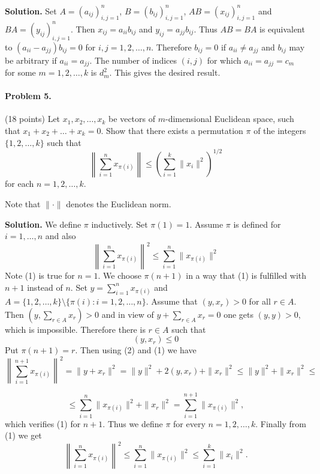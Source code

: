 \documentclass{article}
\begin{document}
\textbf{Solution.}
Set $A = (a_{ij})_{i,j=1}^n$, $B = (b_{ij})_{i,j=1}^n$, $AB = (x_{ij})_{i,j=1}^n$
and $BA = (y_{ij})_{i,j=1}^n$.
Then $x_{ij} = a_{ii}b_{ij}$ and $y_{ij} = a_{jj}b_{ij}$.
Thus $AB = BA$ is equivalent to $(a_{ii} - a_{jj})b_{ij} = 0$
for $i, j = 1, 2, \ldots, n$.
Therefore $b_{ij} = 0$ if $a_{ii} \neq a_{jj}$ and $b_{ij}$
may be arbitrary if $a_{ii} = a_{jj}$.
The number of indices $(i, j)$ for which $a_{ii} = a_{jj} = c_m$
for some $m = 1, 2, \ldots, k$ is $d_m^2$. This gives the desired result.

\paragraph{Problem 5.} (18 points)
Let $x_1, x_2, \ldots, x_k$ be vectors of $m$-dimensional Euclidean space,
such that $x_1 + x_2 + \ldots + x_k = 0$.
Show that there exists a permutation $\pi$ of
the integers $\{1, 2, \ldots, k\}$ such that
\[
\left\| \sum_{i=1}^n x_{\pi(i)} \right\| \leq \left( \sum_{i=1}^k \|x_i\|^2 \right)^{1/2}
\]
for each $n = 1, 2, \ldots, k$.

Note that $\|\cdot\|$ denotes the Euclidean norm.

\textbf{Solution.} We define $\pi$ inductively. Set $\pi(1) = 1$.
Assume $\pi$ is defined for $i = 1, \ldots, n$ and also
\begin{equation}
\left\|\sum_{i=1}^n x_{\pi(i)}\right\|^2 \leq \sum_{i=1}^n \|x_{\pi(i)}\|^2 \tag{1}
\end{equation}
Note (1) is true for $n = 1$. We choose $\pi(n + 1)$ in a way that (1)
is fulfilled with $n + 1$ instead of $n$.
Set $y = \sum_{i=1}^n x_{\pi(i)}$
and $A = \{1, 2, \ldots, k\} \setminus \{\pi(i) : i = 1, 2, \ldots, n\}$.
Assume that $(y, x_r) > 0$ for all $r \in A$.
Then $(y, \sum_{r \in A} x_r) > 0$ and in view of $y + \sum_{r \in A} x_r = 0$
one gets $(y, y) > 0$, which is impossible.
Therefore there is $r \in A$ such that
\begin{equation}
(y, x_r) \leq 0 \tag{2}
\end{equation}
Put $\pi(n + 1) = r$. Then using (2) and (1) we have
\[
\left\|\sum_{i=1}^{n+1} x_{\pi(i)}\right\|^2 = \|y + x_r\|^2 = \|y\|^2 + 2(y, x_r) + \|x_r\|^2 \leq \|y\|^2 + \|x_r\|^2 \leq
\]

\[
\leq \sum_{i=1}^n \|x_{\pi(i)}\|^2 + \|x_r\|^2 = \sum_{i=1}^{n+1} \|x_{\pi(i)}\|^2,
\]
which verifies (1) for $n + 1$. Thus we define $\pi$ for every $n = 1, 2, \ldots, k$. Finally from (1) we get
\[
\left\|\sum_{i=1}^n x_{\pi(i)}\right\|^2 \leq \sum_{i=1}^n \|x_{\pi(i)}\|^2 \leq \sum_{i=1}^k \|x_i\|^2.
\]
\end{document}
